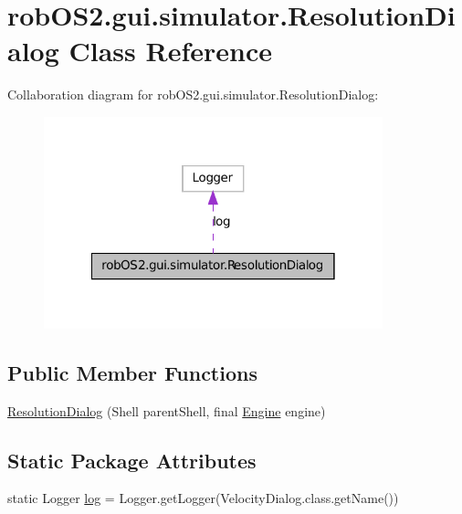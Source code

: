 \hypertarget{classrob_o_s2_1_1gui_1_1simulator_1_1_resolution_dialog}{
\section{robOS2.gui.simulator.ResolutionDialog Class Reference}
\label{classrob_o_s2_1_1gui_1_1simulator_1_1_resolution_dialog}
}


Collaboration diagram for robOS2.gui.simulator.ResolutionDialog:\nopagebreak
\begin{figure}[H]
\begin{center}
\leavevmode
\includegraphics[width=278pt]{classrob_o_s2_1_1gui_1_1simulator_1_1_resolution_dialog__coll__graph}
\end{center}
\end{figure}
\subsection*{Public Member Functions}
\begin{DoxyCompactItemize}
\item 
\hyperlink{classrob_o_s2_1_1gui_1_1simulator_1_1_resolution_dialog_a4b70f46a6fedb10c1b94ec516f89dee7}{ResolutionDialog} (Shell parentShell, final \hyperlink{classrob_o_s2_1_1simulator_1_1_engine}{Engine} engine)
\end{DoxyCompactItemize}
\subsection*{Static Package Attributes}
\begin{DoxyCompactItemize}
\item 
static Logger \hyperlink{classrob_o_s2_1_1gui_1_1simulator_1_1_resolution_dialog_a1a7065811679754f58f4de3056bbb695}{log} = Logger.getLogger(VelocityDialog.class.getName())
\end{DoxyCompactItemize}


